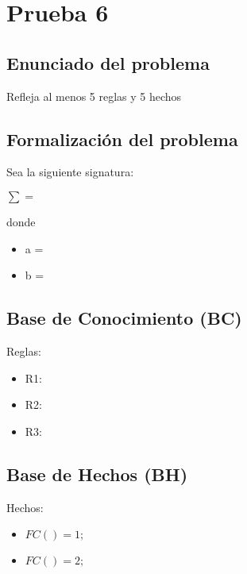 \section{Prueba 6}
\subsection{Enunciado del problema}
Refleja al menos 5 reglas y 5 hechos

\subsection{Formalización del problema}
\par Sea la siguiente signatura:
\par $\sum={}$
\par donde
\begin{itemize}
    \item a =
    \item b =
\end{itemize}

\subsection{Base de Conocimiento (BC)}
Reglas:
\begin{itemize}
    \item R1:
    \item R2:
    \item R3:
\end{itemize}

\subsection{Base de Hechos (BH)}
Hechos:
\begin{itemize}
    \item $FC()= 1;$
    \item $FC()=2;$
\end{itemize}
\newpage


